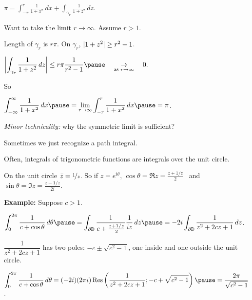 \documentclass[10pt,aspectratio=169]{beamer}
\begin{document}
\begin{frame}
\qquad $\displaystyle \pi 
=
\int_{-r}^r \frac{1}{1+x^2} \, dx
+
\int_{\gamma_r} \frac{1}{1+z^2} \, dz$.

\pause
\medskip

Want to take the limit $r \to \infty$. \pause Assume $r > 1$.

\medskip
\pause

Length of $\gamma_r$ is $r\pi$.  \quad \pause On $\gamma_r$, $\lvert {1+z^2} \rvert \geq r^2-1$.

\medskip
\pause

\qquad $\displaystyle
\abs{
\int_{\gamma_r} \frac{1}{1+z^2} \, dz 
}
\leq
r \pi \frac{1}{r^2-1}
\pause
\quad\underset{\text{as } r \to \infty}{\to}\quad 0 .
$

\medskip
\pause

So

\medskip
\qquad
$\displaystyle
\int_{-\infty}^\infty
\frac{1}{1+x^2} \, dx
\pause
=
\lim_{r\to \infty} \int_{-r}^r 
\frac{1}{1+x^2} \, dx
\pause
= \pi$.

\bigskip
\pause

\emph{Minor technicality:} why the symmetric limit is
sufficient?

\end{frame}

\begin{frame}

Sometimes we just recognize a path integral.

\medskip
\pause

Often, integrals of trigonometric functions are integrals over the unit
circle.

On the unit circle
$\bar{z} = \nicefrac{1}{z}$. \quad  So if $z=e^{i\theta}$, \quad
$\cos \theta = \Re z = \frac{z+1/z}{2}$ ~and~
$\sin \theta = \Im z = \frac{z-1/z}{2i}$.

\pause
\medskip

\textbf{Example:}
Suppose $c > 1$.

\medskip

\qquad$\displaystyle
\int_0^{2\pi} \frac{1}{c+\cos \theta} \, d\theta 
\pause
=
\int_{\partial \D} \frac{1}{c+\frac{z+1/z}{2}} \frac{1}{iz} \, dz
\pause
=
-2i
\int_{\partial \D} \frac{1}{z^2 + 2cz + 1} \, dz$.

\pause
\medskip

$\dfrac{1}{z^2 + 2cz + 1}$ has two poles: $-c \pm \sqrt{c^2-1}$,
one inside and one outside the unit circle.

\pause
\medskip

\qquad$\displaystyle
\int_0^{2\pi} \frac{1}{c+\cos \theta} \, d\theta 
=
(-2i)
(2 \pi i)
\operatorname{Res}
\left(\frac{1}{z^2 + 2cz + 1}; -c+\sqrt{c^2-1}\right)
\pause
=
\frac{2\pi}{\sqrt{c^2-1}}$.

\end{frame}
\end{document}
